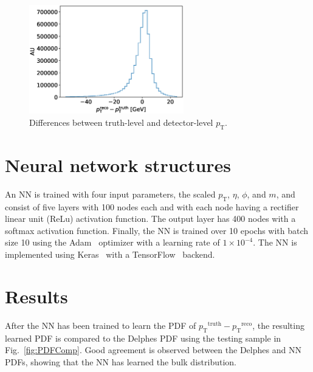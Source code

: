 \documentclass[showpacs,showkeys,preprint,prd,nofootinbib,linenumbers,12pt,superscriptaddress]{revtex4-1}
\def\pt{\ensuremath{p_{\mathrm{T}}}}
\def\ptRes{\ensuremath{\pt^{\mathrm{truth}}-\pt^{\mathrm{reco}}}}
\begin{document}
\begin{figure}[h]
  \includegraphics[width=0.6\textwidth]{figures/nn/pTRes_nobounds_prescaling.eps}
  \caption{Differences between truth-level and detector-level \pt.}
  \label{fig:deltaTarget}
\end{figure}

\section{Neural network structures}

An NN is trained with four input parameters, the scaled \pt, $\eta$, $\phi$, and $m$, and consist of five layers with 100 nodes each and with each node having a rectifier linear unit (ReLu) activation function. The output layer has 400 nodes with a softmax activation function. Finally, the NN is trained over 10 epochs with batch size 10 using the Adam~\cite{adam} optimizer with a learning rate of $1\times10^{-4}$. The NN is implemented using Keras~\cite{chollet2015keras} with a TensorFlow~\cite{tensorflow2015-whitepaper} backend.


\section{Results}

After the NN has been trained to learn the PDF of \ptRes, the resulting learned PDF is compared to the Delphes PDF using the testing sample in Fig.~\ref{fig:PDFComp}. Good agreement is observed between the Delphes and NN PDFs, showing that the NN has learned the bulk distribution.
\end{document}
